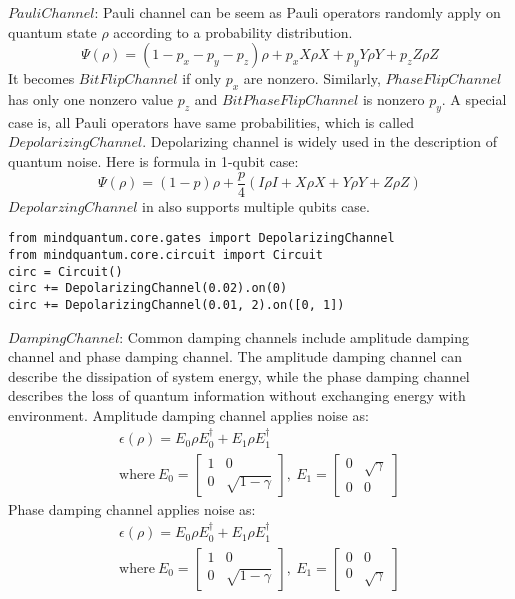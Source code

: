 $Pauli Channel$: Pauli channel can be seem as Pauli operators randomly apply on quantum state $\rho$ according to a probability distribution.
\begin{equation}
    \Psi(\rho) = (1-p_x-p_y-p_z) \rho + p_x X \rho X + p_y Y \rho Y + p_z Z \rho Z
\end{equation}
It becomes $BitFlipChannel$ if only $p_x$ are nonzero. Similarly, $PhaseFlipChannel$ has only one nonzero value $p_z$ and $BitPhaseFlipChannel$ is nonzero $p_y$. A special case is, all Pauli operators have same probabilities, which is called $DepolarizingChannel$. Depolarizing channel is widely used in the description of quantum noise. Here is formula in 1-qubit case:
\begin{equation}
    \Psi(\rho) =  (1-p) \rho + \frac{p}{4}(I\rho I+X\rho X+Y\rho Y+Z\rho Z)
\end{equation}
$Depolarzing Channel$ in \MindQuantum also supports multiple qubits case.
\begin{lstlisting}
from mindquantum.core.gates import DepolarizingChannel
from mindquantum.core.circuit import Circuit
circ = Circuit()
circ += DepolarizingChannel(0.02).on(0)
circ += DepolarizingChannel(0.01, 2).on([0, 1])
\end{lstlisting}
$Damping Channel$: Common damping channels include amplitude damping channel and phase damping channel. The amplitude damping channel can describe the dissipation of system energy, while the phase damping channel describes the loss of quantum information without exchanging energy with environment.
Amplitude damping channel applies noise as:
\begin{gather*}
    \epsilon(\rho) = E_0 \rho E_0^\dagger + E_1 \rho E_1^\dagger
    \\
    \text{where}\ {E_0}=\begin{bmatrix}1 & 0               \\
               0 & \sqrt{1-\gamma}\end{bmatrix},
    \ {E_1}=\begin{bmatrix}0 & \sqrt{\gamma} \\
               0 & 0\end{bmatrix}
\end{gather*}
Phase damping channel applies noise as:
\begin{gather*}
    \epsilon(\rho) = E_0 \rho E_0^\dagger + E_1 \rho E_1^\dagger
    \\
    \text{where}\ {E_0}=\begin{bmatrix}1 & 0               \\
               0 & \sqrt{1-\gamma}\end{bmatrix},
    \ {E_1}=\begin{bmatrix}0 & 0             \\
               0 & \sqrt{\gamma}\end{bmatrix}
\end{gather*}
